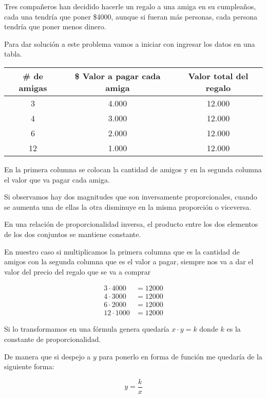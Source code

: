 \documentclass[12pt,a4paper]{article}
\begin{document}
\vspace{0.5cm}

Tres compañeros han decidido hacerle un regalo a una amiga en su cumpleaños, cada una tendría que poner \$4000, aunque si fueran más personas, cada persona tendría que poner menos dinero.

Para dar solución a este problema vamos a iniciar con ingresar los datos en una tabla.

\begin{center}
\begin{tabular}{|c|c|c|}
\hline
\textbf{\# de amigas} & \textbf{\$ Valor a pagar cada amiga} & \textbf{Valor total del regalo} \\
\hline
3 & 4.000 & 12.000 \\
4 & 3.000 & 12.000 \\
6 & 2.000 & 12.000 \\
12 & 1.000 & 12.000 \\
\hline
\end{tabular}
\end{center}

En la primera columna se colocan la cantidad de amigos y en la segunda columna el valor que va pagar cada amiga.

Si observamos hay dos magnitudes que son inversamente proporcionales, cuando se aumenta una de ellas la otra disminuye en la misma proporción o viceversa.

En una relación de proporcionalidad inversa, el producto entre los dos elementos de los dos conjuntos se mantiene constante.

En nuestro caso si multiplicamos la primera columna que es la cantidad de amigos con la segunda columna que es el valor a pagar, siempre nos va a dar el valor del precio del regalo que se va a comprar

\begin{align*}
3 \cdot 4000 &= 12000 \\
4 \cdot 3000 &= 12000 \\
6 \cdot 2000 &= 12000 \\
12 \cdot 1000 &= 12000
\end{align*}

Si lo transformamos en una fórmula genera quedaría $x \cdot y = k$ donde $k$ es la constante de proporcionalidad.

De manera que si despejo a $y$ para ponerlo en forma de función me quedaría de la siguiente forma:

$$y = \frac{k}{x}$$
\end{document}
